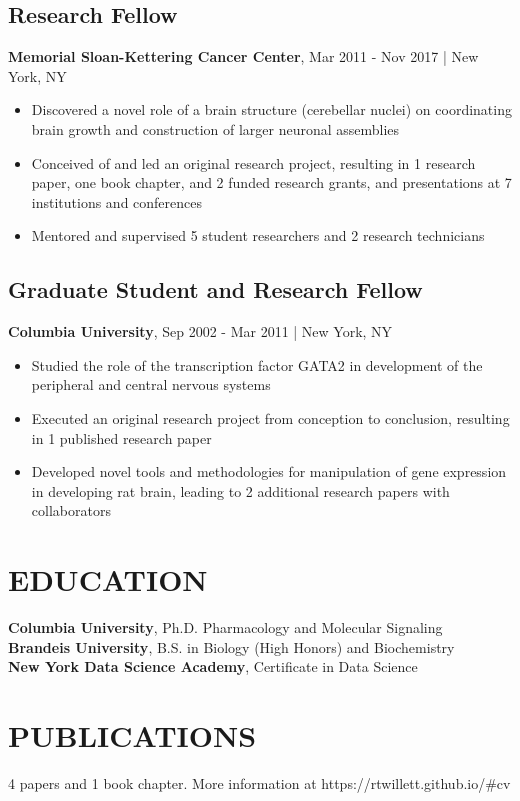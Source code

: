 \documentclass[11pt]{article}
\newenvironment{myitemize}
{ \begin{itemize}
	\setlength{\itemsep}{0pt}
	\setlength{\parskip}{0pt}
	\setlength{\parsep}{0pt}     }
{ \end{itemize}                  }
\begin{document}
\subsection*{Research Fellow}
{\bfseries Memorial Sloan-Kettering Cancer Center}, Mar 2011 - Nov 2017 | New York, NY
\begin{myitemize}
	\item Discovered a novel role of a brain structure (cerebellar nuclei) on coordinating brain growth and construction of larger neuronal assemblies
	\item Conceived of and led an original research project, resulting in 1 research paper, one book chapter, and 2 funded research grants, and presentations at 7 institutions and conferences
	\item Mentored and supervised 5 student researchers and 2 research technicians
\end{myitemize}

\subsection*{Graduate Student and Research Fellow}
{\bfseries Columbia University}, Sep 2002 - Mar 2011 | New York, NY
\begin{myitemize}
	\item Studied the role of the transcription factor GATA2 in development of the peripheral and central nervous systems
	\item Executed an original research project from conception to conclusion, resulting in 1 published research paper 
	\item Developed novel tools and methodologies for manipulation of gene expression in developing rat brain, leading to 2 additional research papers with collaborators
\end{myitemize}

\section*{EDUCATION}
{\bfseries Columbia University}, Ph.D. Pharmacology and Molecular Signaling \\
{\bfseries Brandeis University}, B.S. in Biology (High Honors) and Biochemistry \\
{\bfseries New York Data Science Academy}, Certificate in Data Science

\section*{PUBLICATIONS}
4 papers and 1 book chapter. More information at https://rtwillett.github.io/\#cv
\end{document}
